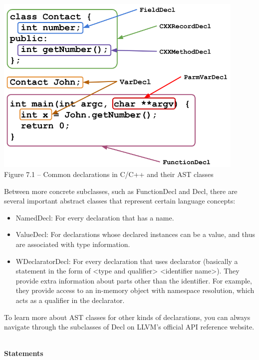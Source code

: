 \hspace*{\fill} \\ %
\begin{center}
\includegraphics[width=0.9\textwidth]{content/2/chapter7/images/1.png}\\
Figure 7.1 – Common declarations in C/C++ and their AST classes
\end{center}

Between more concrete subclasses, such as FunctionDecl and Decl, there are several important abstract classes that represent certain language concepts:

\begin{itemize}
\item NamedDecl: For every declaration that has a name.
\item ValueDecl: For declarations whose declared instances can be a value, and thus are associated with type information.
\item WDeclaratorDecl: For every declaration that uses declarator (basically a statement in the form of <type and qualifier> <identifier name>). They provide extra information about parts other than the identifier. For example, they provide access to an in-memory object with namespace resolution, which acts as a qualifier in the declarator.
\end{itemize}

To learn more about AST classes for other kinds of declarations, you can always navigate through the subclasses of Decl on LLVM's official API reference website.

\hspace*{\fill} \\ %
\noindent
\textbf{Statements}

